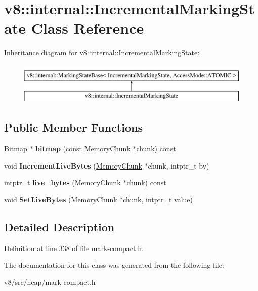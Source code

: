 \hypertarget{classv8_1_1internal_1_1IncrementalMarkingState}{}\section{v8\+:\+:internal\+:\+:Incremental\+Marking\+State Class Reference}
\label{classv8_1_1internal_1_1IncrementalMarkingState}
Inheritance diagram for v8\+:\+:internal\+:\+:Incremental\+Marking\+State\+:\begin{figure}[H]
\begin{center}
\leavevmode
\includegraphics[height=2.000000cm]{classv8_1_1internal_1_1IncrementalMarkingState}
\end{center}
\end{figure}
\subsection*{Public Member Functions}
\begin{DoxyCompactItemize}
\item 
\mbox{\label{classv8_1_1internal_1_1IncrementalMarkingState_aaec0e3b6f3b87f02211f6c1ab60bf7db}} 
\mbox{\hyperlink{classv8_1_1internal_1_1Bitmap}{Bitmap}} $\ast$ {\bfseries bitmap} (const \mbox{\hyperlink{classv8_1_1internal_1_1MemoryChunk}{Memory\+Chunk}} $\ast$chunk) const
\item 
\mbox{\label{classv8_1_1internal_1_1IncrementalMarkingState_a81b084019e208217cfdb7b1372eff373}} 
void {\bfseries Increment\+Live\+Bytes} (\mbox{\hyperlink{classv8_1_1internal_1_1MemoryChunk}{Memory\+Chunk}} $\ast$chunk, intptr\+\_\+t by)
\item 
\mbox{\label{classv8_1_1internal_1_1IncrementalMarkingState_a805d2414c1f857a725eabd8ecd5e3b10}} 
intptr\+\_\+t {\bfseries live\+\_\+bytes} (\mbox{\hyperlink{classv8_1_1internal_1_1MemoryChunk}{Memory\+Chunk}} $\ast$chunk) const
\item 
\mbox{\label{classv8_1_1internal_1_1IncrementalMarkingState_a5a9139036a5ed7ba7d313faa41c83248}} 
void {\bfseries Set\+Live\+Bytes} (\mbox{\hyperlink{classv8_1_1internal_1_1MemoryChunk}{Memory\+Chunk}} $\ast$chunk, intptr\+\_\+t value)
\end{DoxyCompactItemize}


\subsection{Detailed Description}


Definition at line 338 of file mark-\/compact.\+h.



The documentation for this class was generated from the following file\+:\begin{DoxyCompactItemize}
\item 
v8/src/heap/mark-\/compact.\+h\end{DoxyCompactItemize}
